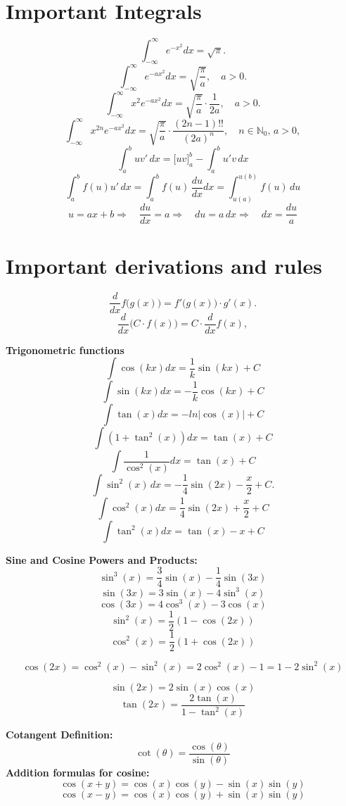 \documentclass[a4paper,8pt,fleqn]{article}
\begin{document}
\begin{multicols}{3}
\section*{Important Integrals}
\[
    \int_{-\infty}^\infty e^{-x^2} dx = \sqrt{\pi}.
    \]
\[
\int_{-\infty}^\infty e^{-a x^2} dx = \sqrt{\frac{\pi}{a}}, \quad a > 0.
\]
\[
\int_{-\infty}^\infty x^2 e^{-a x^2} dx = \sqrt{\frac{\pi}{a}} \cdot \frac{1}{2a}, \quad a > 0.
\]
\[
    \int_{-\infty}^\infty x^{2n} e^{-a x^2} dx = \sqrt{\frac{\pi}{a}} \cdot \frac{(2n-1)!!}{(2a)^n}, \quad n \in \mathbb{N}_0, \, a > 0,
    \]
\[
\int_a^b u v' \, dx = \big[ u v \big]_a^b - \int_a^b u' v \, dx
\]
\[
\int_a^b f(u) u' \, dx =\int_a^b f(u) \, \frac{du}{dx} dx = \int_{u(a)}^{u(b)} f(u) \, du
\]
\[
u = ax + b \Rightarrow \quad \frac{du}{dx} = a \Rightarrow \quad du = a \, dx \Rightarrow \quad dx = \frac{du}{a} 
\]




\section*{Important derivations and rules}

\[
\frac{d}{dx} f\big(g(x)\big) = f'\big(g(x)\big) \cdot g'(x).
\]
\[
\frac{d}{dx}\big(C \cdot f(x)\big) = C \cdot \frac{d}{dx}f(x),
\]





\textbf{Trigonometric functions} \\[-0.2cm]
\[
\int \cos(kx) dx = \frac{1}{k}\sin(kx) + C
\]
\[
\int \sin(kx) dx = -\frac{1}{k}\cos(kx) + C
\]
\[
\int \tan(x) dx = -ln\left|\cos(x)\right| + C
\]
\[
\int (1+\tan^2(x)) dx = \tan(x) + C
\]
\[
\int \frac{1}{\cos^2(x)} dx = \tan(x) +C
\]
\[
\int \sin^2(x) \, dx = -\frac{1}{4} \sin(2x) - \frac{x}{2} + C.
\]
\[
\int \cos^2(x) dx = \frac{1}{4}\sin(2x) + \frac{x}{2}+C
\]
\[
\int \tan^2(x) dx = \tan(x) - x + C
\]


\begin{minipage}{\linewidth}
\textbf{Sine and Cosine Powers and Products:}
\[
\sin^3(x) = \frac{3}{4}\sin(x) - \frac{1}{4}\sin(3x)
\]
\[
\sin(3x) = 3\sin(x) - 4\sin^3(x)
\]
\[
\cos(3x) = 4\cos^3(x) - 3\cos(x)
\]
\[
\sin^2(x) = \frac{1}{2} (1 - \cos(2x)) 
\]
\[
\cos^2(x)  = \frac{1}{2} (1 + \cos(2x))
\]

\[
\cos(2x) = \cos^2(x) - \sin^2(x) = 2\cos^2(x) - 1 = 1 - 2\sin^2(x)
\]

\[
\sin(2x) = 2\sin(x)\cos(x)
\]
\[
\tan(2x) = \frac{2\tan(x)}{1-\tan^2(x)}
\]
\end{minipage}
\begin{minipage}{\linewidth}
\textbf{Cotangent Definition:}
\[
\cot(\theta) = \frac{\cos(\theta)}{\sin(\theta)}
\]
\textbf{Addition formulas for cosine:}
\[
\cos(x + y) = \cos(x)\cos(y) - \sin(x)\sin(y)
\]
\[
\cos(x - y) = \cos(x)\cos(y) + \sin(x)\sin(y)
\]


\end{minipage}
\end{multicols}
\end{document}
